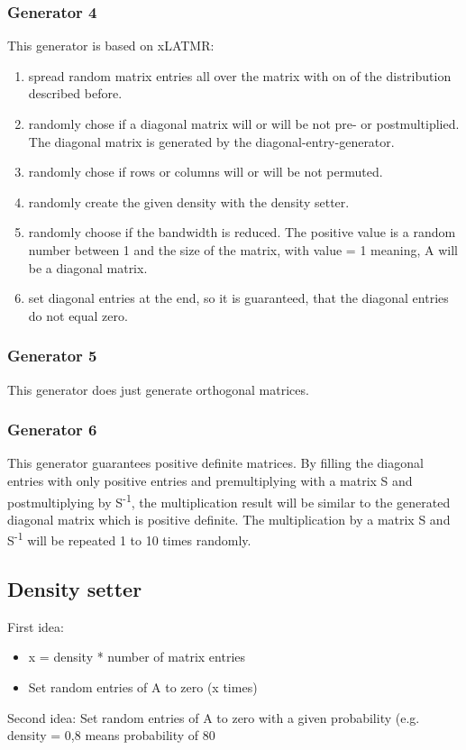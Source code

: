 \documentclass[a4paper]{article}
\begin{document}
\subsubsection{Generator 4}
This generator is based on xLATMR:
\begin{enumerate}
	\item spread random matrix entries all over the matrix with on of the distribution described before.
	\item randomly chose if a diagonal matrix will or will be not pre- or postmultiplied. The diagonal matrix is generated by the diagonal-entry-generator.
	\item randomly chose if rows or columns will or will be not permuted.
	\item randomly create the given density with the density setter.
	\item randomly choose if the bandwidth is reduced. The positive value is a random number between 1 and the size of the matrix, with value = 1 meaning, A will be a diagonal matrix.
	\item set diagonal entries at the end, so it is guaranteed, that the diagonal entries do not equal zero.
\end{enumerate}

\subsubsection{Generator 5}
This generator does just generate orthogonal matrices. 

\subsubsection{Generator 6}
This generator guarantees positive definite matrices.
By filling the diagonal entries with only positive entries and premultiplying with a matrix S and postmultiplying by S\textsuperscript{-1}, the multiplication result will be similar to the generated diagonal matrix which is positive definite. The multiplication by a matrix S and S\textsuperscript{-1} will be repeated 1 to 10 times randomly.

\subsection{Density setter}
First idea:
\begin{itemize}
	\item x = density * number of matrix entries
	\item Set random entries of A to zero (x times)
\end{itemize}
Second idea:
Set random entries of A to zero with a given probability (e.g. density = 0,8 means probability of 80%
\end{document}
